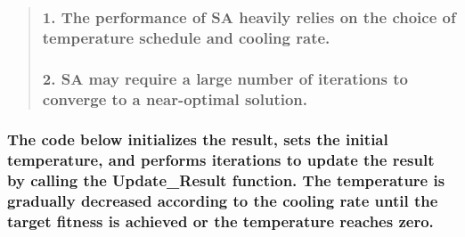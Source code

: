 \documentclass[11pt]{article}
\begin{document}
\begin{quote}
\hypertarget{the-performance-of-sa-heavily-relies-on-the-choice-of-temperature-schedule-and-cooling-rate.}{%
\subsubsection{\texorpdfstring{ 1. The performance of SA heavily relies
on the choice of temperature schedule and cooling
rate.}{  1. The performance of SA heavily relies on the choice of temperature schedule and cooling rate.}}\label{the-performance-of-sa-heavily-relies-on-the-choice-of-temperature-schedule-and-cooling-rate.}}

\hypertarget{sa-may-require-a-large-number-of-iterations-to-converge-to-a-near-optimal-solution.}{%
\subsubsection{\texorpdfstring{ 2. SA may require a large number of
iterations to converge to a near-optimal
solution.}{  2. SA may require a large number of iterations to converge to a near-optimal solution.}}\label{sa-may-require-a-large-number-of-iterations-to-converge-to-a-near-optimal-solution.}}
\end{quote}

\hypertarget{the-code-below-initializes-the-result-sets-the-initial-temperature-and-performs-iterations-to-update-the-result-by-calling-the-update_result-function.-the-temperature-is-gradually-decreased-according-to-the-cooling-rate-until-the-target-fitness-is-achieved-or-the-temperature-reaches-zero.}{%
\subsubsection{\texorpdfstring{ The code below initializes the result,
sets the initial temperature, and performs iterations to update the
result by calling the Update\_Result function. The temperature is
gradually decreased according to the cooling rate until the target
fitness is achieved or the temperature reaches
zero.}{  The code below initializes the result, sets the initial temperature, and performs iterations to update the result by calling the Update\_Result function. The temperature is gradually decreased according to the cooling rate until the target fitness is achieved or the temperature reaches zero.}}\label{the-code-below-initializes-the-result-sets-the-initial-temperature-and-performs-iterations-to-update-the-result-by-calling-the-update_result-function.-the-temperature-is-gradually-decreased-according-to-the-cooling-rate-until-the-target-fitness-is-achieved-or-the-temperature-reaches-zero.}}
\end{document}
